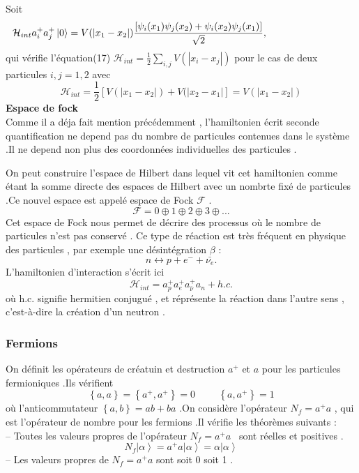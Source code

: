 \documentclass[12pt,a4paper, openany]{article}
\begin{document}
\hspace{-0.5cm}Soit 
\begin{equation}
\hspace{-3cm}	\mathcal{H}_{int}a_i^{+}a_j^{+}\left|0\right\rangle= V(\left|x_1-x_2\right|)\frac{\left[{\psi}_i(x_1){\psi}_j(x_2)+{\psi}_i(x_2){\psi}_j(x_1)\right]}{\sqrt{2}} ,
\end{equation}
qui vérifie l'équation(17) $\mathcal{H}_{int}=\frac{1}{2}\sum_{i,j}V(\left|x_i-x_j\right|)$ pour le cas de deux particules $ i,j=1,2$  avec 
\begin{equation}
\mathcal{H}_{int}=\frac{1}{2}[V(\left|x_1-x_2\right|)+V(\left|x_2-x_1\right|]=V(\left|x_1-x_2\right|)
\end{equation}
\textbf{Espace de fock}\\
Comme il a déja fait mention précédemment , l'hamiltonien écrit seconde quantification ne depend pas du nombre de particules contenues dans le système .Il ne depend non plus des coordonnées individuelles des particules .

On peut construire l'espace de Hilbert dans lequel vit cet hamiltonien comme étant la somme directe des espaces de Hilbert avec un nombrte fixé de particules .Ce nouvel espace est appelé espace de Fock $\mathcal{F}$ .
\begin{equation}
	\mathcal{F}=0\oplus 1 \oplus 2 \oplus 3 \oplus...
\end{equation}
Cet espace de Fock nous permet de décrire des processus où le nombre de particules n'est pas conservé . Ce type de réaction est très fréquent en physique des particules , par exemple une désintégration $\beta$ :
\begin{equation}
	n\leftrightarrow p +e^{-}+\bar{\nu_{e}}.
\end{equation}
L'hamiltonien d'interaction s'écrit ici 
$$ \mathcal{H}_{int}= a^{+}_pa^{+}_e a^{+}_{\bar{\nu}} a_n +h.c.$$ 
où h.c. signifie hermitien conjugué , et réprésente la réaction dans l'autre sens , c'est-à-dire la création d'un neutron .


	

\subsubsection{Fermions}
\hspace{0.5cm}On définit les opérateurs de créatuin et destruction $a^{+}$ et $a$ pour les particules fermioniques .Ils vérifient 
\begin{equation}
	\left\{a,a\right\}=\left\{a^+,a^+\right\}=0 \hspace{1cm} \left\{a, a^+\right\}=1
\end{equation}
où l'anticommutateur $\left\{a,b\right\}=ab+ba $ .On considère l'opérateur $N_{f}=a^{+}a$ , qui est l'opérateur de nombre pour les fermions .Il vérifie les théorèmes suivants :\\
 – Toutes  les valeurs propres de l'opérateur $N_{f}=a^{+}a$ \, sont réelles et positives .
 \begin{equation}
 	N_{f}\left|\alpha\right\rangle=a^{+}a\left|\alpha\right\rangle=\alpha\left|\alpha\right\rangle
 \end{equation}
 – Les valeurs propres de $N_{f}=a^{+}a$ sont soit 0 soit 1 .\\
 
\end{document}
